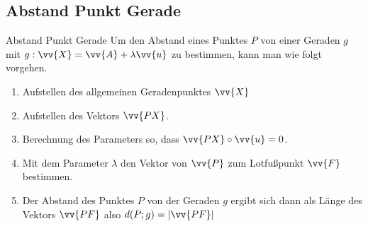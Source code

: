 \subsection{Abstand Punkt Gerade}
    \begin{merke}{Abstand Punkt Gerade}{}
        Um den Abstand eines Punktes \(P\) von einer Geraden \(g\) mit \(g:\vv{X} = \vv{A} + \lambda \vv{u}\) zu bestimmen, kann man wie folgt vorgehen.
        \begin{enumerate}
            \item Aufstellen des allgemeinen Geradenpunktes \(\vv{X}\)
            \item Aufstellen des Vektors \(\vv{PX}\).
            \item Berechnung des Parameters so, dass \(\vv{PX} \circ \vv{u} =0\).
            \item Mit dem Parameter \(\lambda\) den Vektor von \(\vv{P}\) zum Lotfußpunkt \(\vv{F}\) bestimmen.
            \item Der Abstand des Punktes \(P\) von der Geraden \(g\) ergibt sich dann als Länge des Vektors \(\vv{PF}\) also \(d(P;g) = |\vv{PF}|\)
        \end{enumerate}
    \end{merke}
